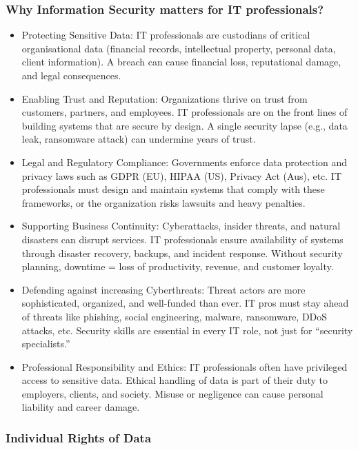 \subsubsection{Why Information Security matters for IT professionals?}

\begin{itemize}
    \item Protecting Sensitive Data: IT professionals are custodians of critical organisational data (financial records, intellectual property, personal data, client information). A breach can cause financial loss, reputational damage, and legal consequences.
    \item Enabling Trust and Reputation: Organizations thrive on trust from customers, partners, and employees. IT professionals are on the front lines of building systems that are secure by design. A single security lapse (e.g., data leak, ransomware attack) can undermine years of trust.
    \item Legal and Regulatory Compliance: Governments enforce data protection and privacy laws such as GDPR (EU), HIPAA (US), Privacy Act (Aus), etc. IT professionals must design and maintain systems that comply with these frameworks, or the organization risks lawsuits and heavy penalties.
    \item Supporting Business Continuity: Cyberattacks, insider threats, and natural disasters can disrupt services. IT professionals ensure availability of systems through disaster recovery, backups, and incident response. Without security planning, downtime = loss of productivity, revenue, and customer loyalty.
    \item Defending against increasing Cyberthreats: Threat actors are more sophisticated, organized, and well-funded than ever. IT pros must stay ahead of threats like phishing, social engineering, malware, ransomware, DDoS attacks, etc. Security skills are essential in every IT role, not just for “security specialists.”
    \item Professional Responsibility and Ethics: IT professionals often have privileged access to sensitive data. Ethical handling of data is part of their duty to employers, clients, and society. Misuse or negligence can cause personal liability and career damage.
\end{itemize}

\subsubsection{Individual Rights of Data}

